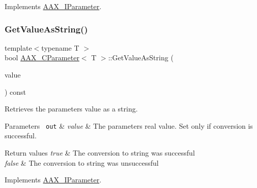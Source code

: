 Implements \mbox{\hyperlink{a01857_ad9ab3c9e0ee521e445f44b77ae5d9d06}{A\+A\+X\+\_\+\+I\+Parameter}}.

\mbox{\label{a01537_a7c5e951eb4c32b2993048acb414adc52}} 
\subsubsection{\texorpdfstring{GetValueAsString()}{GetValueAsString()}\hspace{0.1cm}{\footnotesize\ttfamily [1/2]}}
{\footnotesize\ttfamily template$<$typename T $>$ \\
bool \mbox{\hyperlink{a01537}{A\+A\+X\+\_\+\+C\+Parameter}}$<$ T $>$\+::Get\+Value\+As\+String (\begin{DoxyParamCaption}\item[{\mbox{\hyperlink{a01873}{A\+A\+X\+\_\+\+I\+String}} $\ast$}]{value }\end{DoxyParamCaption}) const\hspace{0.3cm}{\ttfamily [virtual]}}



Retrieves the parameter\textquotesingle{}s value as a string. 


\begin{DoxyParams}[1]{Parameters}
\mbox{\texttt{ out}}  & {\em value} & The parameter\textquotesingle{}s real value. Set only if conversion is successful.\\
\hline
\end{DoxyParams}

\begin{DoxyRetVals}{Return values}
{\em true} & The conversion to string was successful \\
\hline
{\em false} & The conversion to string was unsuccessful \\
\hline
\end{DoxyRetVals}


Implements \mbox{\hyperlink{a01857_ab0d640c37120decbbe48f0c1483770f9}{A\+A\+X\+\_\+\+I\+Parameter}}.

\mbox{\label{a01537_a2089ea0d243087c562ce8b1bd89a495a}} 
